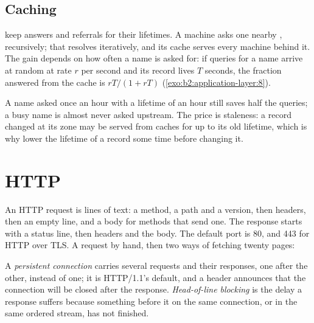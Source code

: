 \label{out:b2:application-layer:demo}

\subsection{Caching}

 keep answers and referrals for their lifetimes. A machine asks one nearby , recursively; that
 resolves iteratively, and its cache serves every machine behind it. The gain depends on how often a name is
asked for: if queries for a name arrive at random at rate $r$ per second and its record lives $T$ seconds, the fraction
answered from the cache is $rT/(1 + rT)$ (\cref{exo:b2:application-layer:8}).

\label{out:b2:application-layer:cache}

A name asked once an hour with a lifetime of an hour still saves half the queries; a busy name is almost never asked
upstream. The price is staleness: a record changed at its zone may be served from caches for up to its old lifetime,
which is why  lower the lifetime of a record some time before changing it.

\section{HTTP}\label{sec:b2:application-layer:http}

An HTTP request is lines of text: a method, a path and a version, then headers, then an empty line, and a body for
methods that send one. The response starts with a status line, then headers and the body. The default port is 80, and
443 for HTTP over TLS. A request by hand, then two ways of fetching twenty pages:

\label{out:b2:application-layer:http}

\begin{definition}\label{def:b2:application-layer:persistent}
A \emph{persistent connection} carries several requests and their responses, one after
the other, instead of one; it is HTTP/1.1's default, and a  header announces that the
connection will be closed after the response. \emph{Head-of-line blocking} is the delay a
response suffers because something before it on the same connection, or in the same ordered stream, has not finished.
\end{definition}

